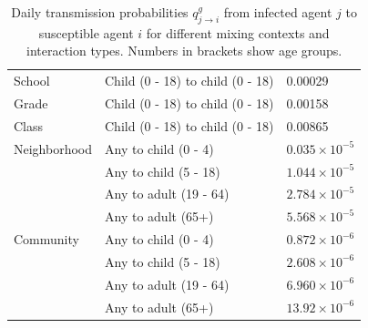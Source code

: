 \documentclass{article}
\begin{document}
\begin{appendices}
\begin{table}
\begin{tabular}{l|l|l}
    \hline
    \rule{0pt}{3ex}School               & Child (0 - 18) to child (0 - 18)  &  \hspace{1.7cm} 0.00029\\
    Grade                               & Child (0 - 18) to child (0 - 18)  &  \hspace{1.7cm} 0.00158\\
    Class                               & Child (0 - 18) to child (0 - 18)  &  \hspace{1.7cm} 0.00865\\[0.1cm]
                           
   \hline
    \rule{0pt}{3ex}Neighborhood         & Any to child (0 - 4)          &  \hspace{1.7cm} $0.035 \times 10^{-5}$\\
                                        & Any to child (5 - 18)         &  \hspace{1.7cm} $1.044 \times 10^{-5}$\\
                                        & Any to adult (19 - 64)        &  \hspace{1.7cm} $2.784 \times 10^{-5}$\\
                                        & Any to adult (65+)            &  \hspace{1.7cm} $5.568 \times 10^{-5}$\\[0.1cm]
    
    \hline
    \rule{0pt}{3ex}Community            & Any to child (0 - 4)          &  \hspace{1.7cm} $0.872 \times 10^{-6}$\\
                                        & Any to child (5 - 18)         &  \hspace{1.7cm} $2.608 \times 10^{-6}$\\
                                        & Any to adult (19 - 64)        &  \hspace{1.7cm} $6.960 \times 10^{-6}$\\
                                        & Any to adult (65+)            &  \hspace{1.7cm} $13.92 \times 10^{-6}$\\[0.1cm]
    
    \hline
    \end{tabular}
    \caption{Daily transmission probabilities $q^g_{j \rightarrow i}$ from infected agent $j$ to susceptible agent $i$ for different mixing contexts and interaction types. Numbers in brackets show age groups.\vspace*{-0.5cm}}
    \label{tab:daily_transmission_probability}
\end{table}


\end{appendices}
\end{document}
